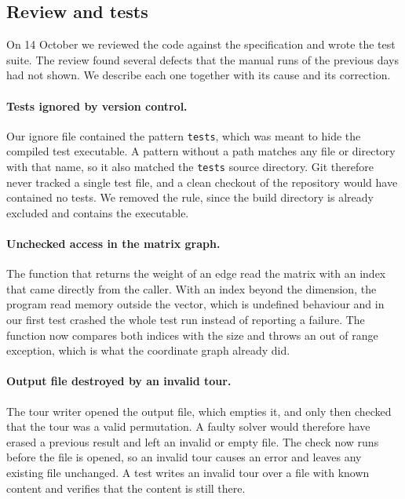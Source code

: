 \documentclass[11pt,a4paper]{article}
\begin{document}
\subsection{Review and tests}

On 14 October we reviewed the code against the specification and wrote the test suite. The review found several defects that the manual runs of the previous days had not shown. We describe each one together with its cause and its correction.

\paragraph{Tests ignored by version control.} Our ignore file contained the pattern \texttt{tests}, which was meant to hide the compiled test executable. A pattern without a path matches any file or directory with that name, so it also matched the \texttt{tests} source directory. Git therefore never tracked a single test file, and a clean checkout of the repository would have contained no tests. We removed the rule, since the build directory is already excluded and contains the executable.

\paragraph{Unchecked access in the matrix graph.} The function that returns the weight of an edge read the matrix with an index that came directly from the caller. With an index beyond the dimension, the program read memory outside the vector, which is undefined behaviour and in our first test crashed the whole test run instead of reporting a failure. The function now compares both indices with the size and throws an out of range exception, which is what the coordinate graph already did.

\paragraph{Output file destroyed by an invalid tour.} The tour writer opened the output file, which empties it, and only then checked that the tour was a valid permutation. A faulty solver would therefore have erased a previous result and left an invalid or empty file. The check now runs before the file is opened, so an invalid tour causes an error and leaves any existing file unchanged. A test writes an invalid tour over a file with known content and verifies that the content is still there.
\end{document}
